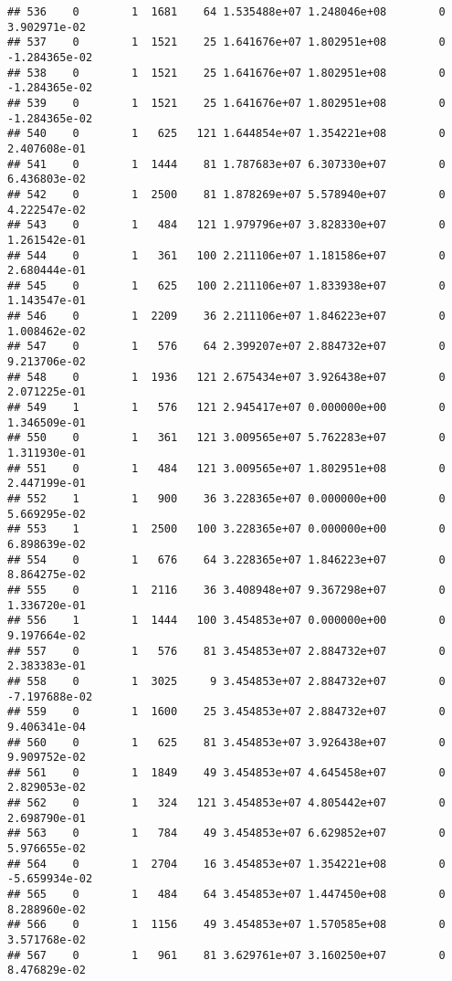 \documentclass[
]{article}
\begin{document}
\begin{enumerate}
\begin{verbatim}
## 536    0        1  1681    64 1.535488e+07 1.248046e+08        0  3.902971e-02
## 537    0        1  1521    25 1.641676e+07 1.802951e+08        0 -1.284365e-02
## 538    0        1  1521    25 1.641676e+07 1.802951e+08        0 -1.284365e-02
## 539    0        1  1521    25 1.641676e+07 1.802951e+08        0 -1.284365e-02
## 540    0        1   625   121 1.644854e+07 1.354221e+08        0  2.407608e-01
## 541    0        1  1444    81 1.787683e+07 6.307330e+07        0  6.436803e-02
## 542    0        1  2500    81 1.878269e+07 5.578940e+07        0  4.222547e-02
## 543    0        1   484   121 1.979796e+07 3.828330e+07        0  1.261542e-01
## 544    0        1   361   100 2.211106e+07 1.181586e+07        0  2.680444e-01
## 545    0        1   625   100 2.211106e+07 1.833938e+07        0  1.143547e-01
## 546    0        1  2209    36 2.211106e+07 1.846223e+07        0  1.008462e-02
## 547    0        1   576    64 2.399207e+07 2.884732e+07        0  9.213706e-02
## 548    0        1  1936   121 2.675434e+07 3.926438e+07        0  2.071225e-01
## 549    1        1   576   121 2.945417e+07 0.000000e+00        0  1.346509e-01
## 550    0        1   361   121 3.009565e+07 5.762283e+07        0  1.311930e-01
## 551    0        1   484   121 3.009565e+07 1.802951e+08        0  2.447199e-01
## 552    1        1   900    36 3.228365e+07 0.000000e+00        0  5.669295e-02
## 553    1        1  2500   100 3.228365e+07 0.000000e+00        0  6.898639e-02
## 554    0        1   676    64 3.228365e+07 1.846223e+07        0  8.864275e-02
## 555    0        1  2116    36 3.408948e+07 9.367298e+07        0  1.336720e-01
## 556    1        1  1444   100 3.454853e+07 0.000000e+00        0  9.197664e-02
## 557    0        1   576    81 3.454853e+07 2.884732e+07        0  2.383383e-01
## 558    0        1  3025     9 3.454853e+07 2.884732e+07        0 -7.197688e-02
## 559    0        1  1600    25 3.454853e+07 2.884732e+07        0  9.406341e-04
## 560    0        1   625    81 3.454853e+07 3.926438e+07        0  9.909752e-02
## 561    0        1  1849    49 3.454853e+07 4.645458e+07        0  2.829053e-02
## 562    0        1   324   121 3.454853e+07 4.805442e+07        0  2.698790e-01
## 563    0        1   784    49 3.454853e+07 6.629852e+07        0  5.976655e-02
## 564    0        1  2704    16 3.454853e+07 1.354221e+08        0 -5.659934e-02
## 565    0        1   484    64 3.454853e+07 1.447450e+08        0  8.288960e-02
## 566    0        1  1156    49 3.454853e+07 1.570585e+08        0  3.571768e-02
## 567    0        1   961    81 3.629761e+07 3.160250e+07        0  8.476829e-02

\end{verbatim}
\end{enumerate}
\end{document}
